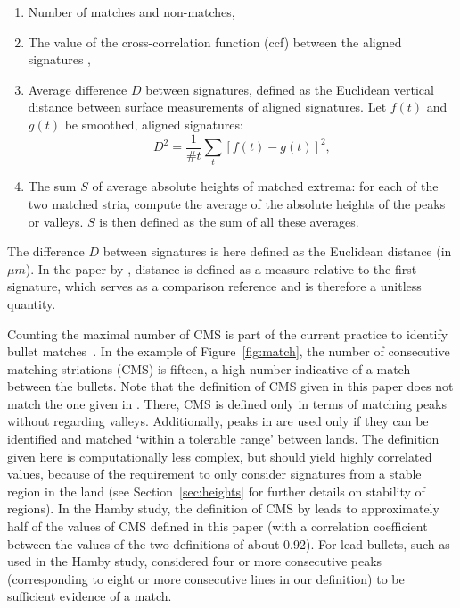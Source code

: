 \documentclass[aoas, preprint]{imsart}\usepackage[]{graphicx}\usepackage[]{color}
\begin{document}
\begin{enumerate}
\begin{enumerate}[label=(\roman*)]
\item Number of matches and non-matches,
\item The value of the cross-correlation function (ccf) between the aligned signatures \cite{vorburger:2011},
\item Average difference $D$ between signatures, defined as the Euclidean vertical distance between surface measurements of aligned signatures. Let $f(t)$ and $g(t)$ be smoothed, aligned signatures:
\[
D^2 = \frac{1}{\text{\#}t}\sum_t \left[f(t) - g(t)\right]^2,
\]
\item The sum $S$ of average absolute heights of matched extrema: for each of the two matched stria, compute the average of the absolute heights of the peaks or valleys. $S$ is then defined as the sum of all these averages. 
\end{enumerate}
\end{enumerate}
%
The difference $D$ between signatures is here defined as the Euclidean distance (in $\mu m$). In the paper by \citet{ma:2004}, distance is defined as a measure relative to the first signature, which serves as a comparison reference and is therefore a unitless quantity. 

Counting the maximal number of CMS is part of the current practice to identify bullet matches~\citep{nichols:1997, nichols:2003, nichols:2003b}. 
In the example of Figure~\ref{fig:match}, the number of consecutive matching striations (CMS) is fifteen, a high number indicative of a match between the bullets. 
 Note that the definition of CMS given in this paper does not match the one given in \citet{thompson:2013}. There, CMS is defined only in terms of matching peaks without regarding valleys. Additionally, peaks in  \citet{thompson:2013} are  used only if they can be identified and matched `within a tolerable range' between lands. The definition given here is computationally less complex, but should yield highly correlated values, because of the requirement to only consider signatures from a stable region in the land (see Section~\ref{sec:heights} for further details on stability of regions). In the Hamby study, the definition of CMS by \citet{thompson:2013} leads to approximately half of the values of CMS defined in this paper (with a correlation coefficient between the values of the two definitions of about 0.92). 
For lead bullets, such as used in the Hamby study, \citet{biasotti:1959} considered four or more consecutive peaks (corresponding to eight or more consecutive lines in our definition) to be sufficient evidence of a match.  %
\end{document}
